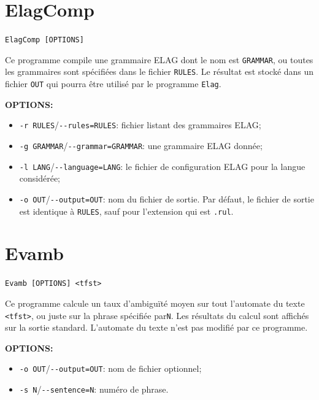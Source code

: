 \section{ElagComp}
\verb+ElagComp [OPTIONS]+

\bigskip
\noindent Ce programme compile une grammaire ELAG dont le nom est \verb+GRAMMAR+,  ou toutes les grammaires sont spécifiées dans le fichier \verb+RULES+. Le résultat est stocké dans un fichier \verb+OUT+ qui pourra être utilisé par le programme \verb+Elag+.

\bigskip
\noindent \textbf{OPTIONS:}
\begin{itemize}
  \item \verb+-r RULES+/\verb+--rules=RULES+: fichier listant des grammaires ELAG;
  \item \verb+-g GRAMMAR+/\verb+--grammar=GRAMMAR+: une grammaire ELAG donnée;
  \item \verb+-l LANG+/\verb+--language=LANG+: le fichier de configuration ELAG pour la langue
  	  considérée;
  \item \verb+-o OUT+/\verb+--output=OUT+: nom du fichier de sortie. Par défaut, le fichier de
  	  sortie est identique à \verb+RULES+, sauf pour l’extension qui est
  	  \verb+.rul+.
\end{itemize}








\section{Evamb}
\verb+Evamb [OPTIONS] <tfst>+

\bigskip
\noindent Ce programme calcule un taux d’ambiguïté moyen sur tout l’automate du texte \verb+<tfst>+,
ou juste sur la phrase spécifiée par\verb+N+. Les résultats du calcul sont affichés sur la sortie standard. L’automate du texte n’est pas modifié par ce programme.

\bigskip
\noindent \textbf{OPTIONS:}
\begin{itemize}
\item \verb+-o OUT+/\verb+--output=OUT+: nom de fichier optionnel;
  \item \verb+-s N+/\verb+--sentence=N+: numéro de phrase.
\end{itemize}








